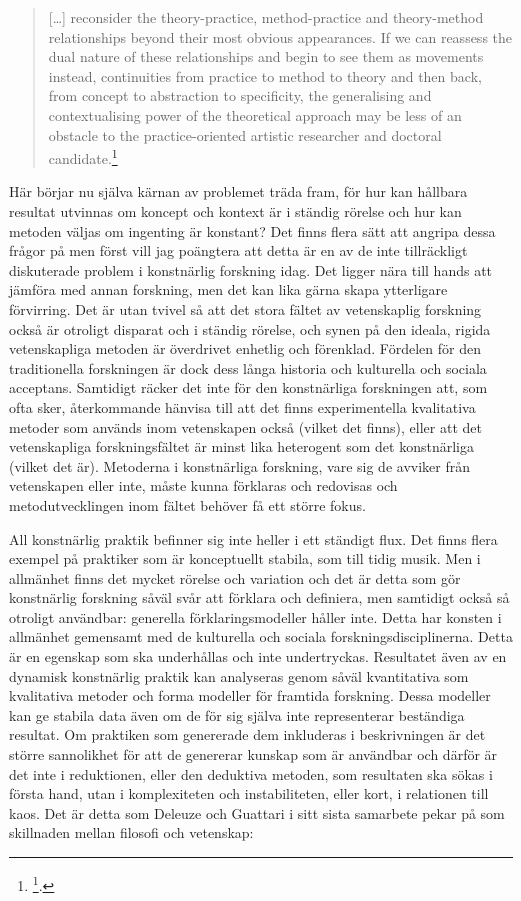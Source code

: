 \documentclass[11pt]{article}
\begin{document}
\begin{quote}
[\ldots{}] reconsider the theory-practice, method-practice and
theory-method relationships beyond their most obvious appearances. If
we can reassess the dual nature of these relationships and begin to
see them as movements instead, continuities from practice to method to
theory and then back, from concept to abstraction to specificity, the
generalising and contextualising power of the theoretical approach may
be less of an obstacle to the practice-oriented artistic researcher
and doctoral candidate.\footnote{\footcite[s.120]{frisk2015}.}
\end{quote}

Här börjar nu själva kärnan av problemet träda fram, för hur kan
hållbara resultat utvinnas om koncept och kontext är i ständig rörelse
och hur kan metoden väljas om ingenting är konstant? Det finns flera
sätt att angripa dessa frågor på men först vill jag poängtera att detta
är en av de inte tillräckligt diskuterade problem i konstnärlig
forskning idag. Det ligger nära till hands att jämföra med annan
forskning, men det kan lika gärna skapa ytterligare förvirring. Det är
utan tvivel så att det stora fältet av vetenskaplig forskning också är
otroligt disparat och i ständig rörelse, och synen på den ideala, rigida
vetenskapliga metoden är överdrivet enhetlig och förenklad. Fördelen för
den traditionella forskningen är dock dess långa historia och kulturella
och sociala acceptans. Samtidigt räcker det inte för den konstnärliga
forskningen att, som ofta sker, återkommande hänvisa till att det finns
experimentella kvalitativa metoder som används inom vetenskapen också
(vilket det finns), eller att det vetenskapliga forskningsfältet är
minst lika heterogent som det konstnärliga (vilket det är). Metoderna i
konstnärliga forskning, vare sig de avviker från vetenskapen eller inte,
måste kunna förklaras och redovisas och metodutvecklingen inom fältet
behöver få ett större fokus.

All konstnärlig praktik befinner sig inte heller i ett ständigt flux.
Det finns flera exempel på praktiker som är konceptuellt stabila, som
till tidig musik. Men i allmänhet finns det mycket rörelse och variation
och det är detta som gör konstnärlig forskning såväl svår att förklara
och definiera, men samtidigt också så otroligt användbar: generella
förklaringsmodeller håller inte. Detta har konsten i allmänhet gemensamt
med de kulturella och sociala forskningsdisciplinerna. Detta är en
egenskap som ska underhållas och inte undertryckas. Resultatet även av
en dynamisk konstnärlig praktik kan analyseras genom såväl kvantitativa
som kvalitativa metoder och forma modeller för framtida forskning. Dessa
modeller kan ge stabila data även om de för sig själva inte
representerar beständiga resultat. Om praktiken som genererade dem
inkluderas i beskrivningen är det större sannolikhet för att de
genererar kunskap som är användbar och därför är det inte i reduktionen,
eller den deduktiva metoden, som resultaten ska sökas i första hand,
utan i komplexiteten och instabiliteten, eller kort, i relationen till
kaos. Det är detta som Deleuze och Guattari i sitt sista samarbete pekar
på som skillnaden mellan filosofi och vetenskap:
\end{document}
